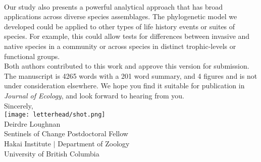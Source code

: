 \documentclass[11pt,a4paper]{article}
\begin{document}
\vspace{1.5ex}\\
Our study also presents a powerful analytical approach that has broad applications across diverse species assemblages. The phylogenetic model we developed could be applied to other types of life history events or suites of species. For example, this could allow tests for differences between invasive and native species in a community or across species in distinct trophic-levels or functional groups.
\vspace{1.5ex}\\
\noindent Both authors contributed to this work and approve this version for submission. The manuscript is 4265 words with a 201 word summary, and 4 figures and is not under consideration elsewhere. We hope you find it suitable for publication in \emph{Journal of Ecology}, and look forward to hearing from you. 
\vspace{1.5ex}\\
\noindent Sincerely, \\
\texttt{[image: letterhead/shot.png]} \\ 
\noindent Deirdre Loughnan\\
\noindent Sentinels of Change Postdoctoral Fellow\\ 
\noindent Hakai Institute $|$ Department of Zoology\\
\noindent University of British Columbia
\newpage
\vspace{-5ex}
% 


\newpage
\end{document}
